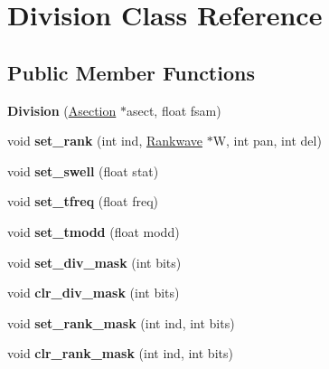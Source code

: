 \hypertarget{class_division}{}\section{Division Class Reference}
\label{class_division}
\subsection*{Public Member Functions}
\begin{DoxyCompactItemize}
\item 
\mbox{\label{class_division_ab6acf0fa790d003a1fa8d60f24f6e31f}} 
{\bfseries Division} (\hyperlink{class_asection}{Asection} $\ast$asect, float fsam)
\item 
\mbox{\label{class_division_a082eb6305d1afdd1698965d5f6b63ab4}} 
void {\bfseries set\+\_\+rank} (int ind, \hyperlink{class_rankwave}{Rankwave} $\ast$W, int pan, int del)
\item 
\mbox{\label{class_division_a0d0684eebb1ccd476838b254de452653}} 
void {\bfseries set\+\_\+swell} (float stat)
\item 
\mbox{\label{class_division_aa3a6b1fc3745b7dba3216fdf6e3efaa9}} 
void {\bfseries set\+\_\+tfreq} (float freq)
\item 
\mbox{\label{class_division_a71ac56d391bef63980cd4eeae01e96e0}} 
void {\bfseries set\+\_\+tmodd} (float modd)
\item 
\mbox{\label{class_division_a044d208bca719bbbae16ec39d69380ec}} 
void {\bfseries set\+\_\+div\+\_\+mask} (int bits)
\item 
\mbox{\label{class_division_aaa5e7467de91e241ee33d260c3e9338e}} 
void {\bfseries clr\+\_\+div\+\_\+mask} (int bits)
\item 
\mbox{\label{class_division_ae8fcfc63652ff008582cd67cb87ccbdb}} 
void {\bfseries set\+\_\+rank\+\_\+mask} (int ind, int bits)
\item 
\mbox{\label{class_division_a4fa0d643ddfb3e81615bfe1ed58ff473}} 
void {\bfseries clr\+\_\+rank\+\_\+mask} (int ind, int bits)

\end{DoxyCompactItemize}

